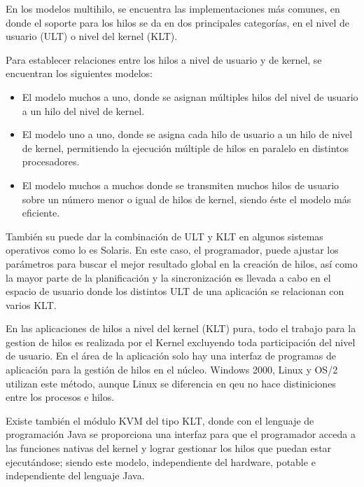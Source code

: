 \documentclass[12pt, letter]{article}
\begin{document}
%
\setlength{\parindent}{31pt}
En los modelos multihilo, se encuentra las implementaciones más comunes, en donde el soporte para los hilos se da en dos principales categorías, en el nivel de usuario (ULT) o nivel del kernel (KLT).

\setlength{\parindent}{31pt}
Para establecer relaciones entre los hilos a nivel de usuario y de kernel, se encuentran los siguientes modelos: 

\begin{itemize}
\item El modelo muchos a uno, donde se asignan múltiples hilos del nivel de usuario a un hilo del nivel de kernel.
\item El modelo uno a uno, donde se asigna cada hilo de usuario a un hilo de nivel de kernel, permitiendo la ejecución múltiple de hilos en paralelo en distintos procesadores.
\item El modelo muchos a muchos donde se transmiten muchos hilos de usuario sobre un número menor o igual de hilos de kernel, siendo éste el modelo más eficiente. 
\end{itemize}

\setlength{\parindent}{31pt}
También su puede dar la combinación de ULT y KLT en algunos sistemas operativos como lo es Solaris. En este caso, el programador, puede ajustar los parámetros para buscar el mejor resultado global en la creación de hilos, así como la mayor parte de la planificación y la sincronización es llevada a cabo en el espacio de usuario donde los distintos ULT de una aplicación se relacionan con varios KLT.

%
\setlength{\parindent}{31pt}
En las aplicaciones de hilos a nivel del kernel (KLT) pura, todo el trabajo para la gestion de hilos es realizada por el Kernel excluyendo toda participación del nivel de usuario. En el área de la aplicación solo hay una interfaz de programas de aplicación para la gestión de hilos en el núcleo. Windows 2000, Linux y OS/2 utilizan este método, aunque Linux se diferencia en qeu no hace distiniciones entre los procesos e hilos.

\setlength{\parindent}{31pt}
Existe también el módulo KVM del tipo KLT, donde con el lenguaje de programación Java se proporciona una interfaz para que el programador acceda a las funciones nativas del kernel y lograr gestionar los hilos que puedan estar ejecutándose; siendo este modelo, independiente del hardware, potable e independiente del lenguaje Java.
\end{document}
